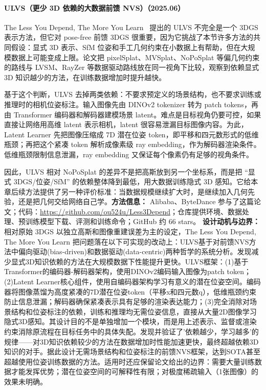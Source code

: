 \paragraph{ULVS（更少 3D 依赖的大数据前馈 NVS）（2025.06）}
The Less You Depend, The More You Learn~\cite{2506_09885} 提出的 ULVS 不完全是一个 3DGS 表示方法，但它对 pose-free 前馈 3DGS 很重要，因为它挑战了本节许多方法的共同假设：显式 3D 表示、SfM 位姿和手工几何约束在小数据上有帮助，但在大规模数据上可能变成上限。论文把 pixelSplat、MVSplat、NoPoSplat 等偏几何约束的路线与 LVSM、RayZer 等数据驱动路线放在同一视角下比较，观察到依赖显式 3D 知识越少的方法，在训练数据增加时提升越快。

基于这个判断，ULVS 去掉两类依赖：不要求预定义的场景结构，也不要求训练或推理时的相机位姿标注。输入图像先由 DINOv2 tokenizer 转为 patch tokens，再由 Transformer 编码器和解码器建模场景 latent。难点是目标视角仍要可控，如果直接让网络用高维 latent 表示相机，latent 很容易泄漏目标图像内容。为此，Latent Learner 先把图像压缩成 7D 潜在位姿 token，即平移和四元数形式的低维瓶颈；再把这个紧凑 token 解析成像素级 ray embedding，作为解码器渲染条件。低维瓶颈限制信息泄漏，ray embedding 又保证每个像素仍有足够的视角条件。

因此，ULVS 相对 NoPoSplat 的差异不是把高斯放到另一个坐标系，而是把 ``显式 3DGS/位姿/SfM'' 的依赖整体降到最低，用大数据训练隐式 3D 感知。它给本章后续方法提供了另一种评价标准：当数据规模继续扩大时，是继续加入几何先验，还是把几何交给网络自己学。\textbf{方法信息：} Alibaba、ByteDance 参与了这篇论文；代码：\url{https://github.com/ou524u/Less3Depend}；仓库提供环境、数据处理、预训练模型下载、评测和训练命令；GitHub 约 66 stars。
\textbf{设计动机与边界：} 相对原始 3DGS 以独立高斯和图像重建误差为主的设定，The Less You Depend, The More You Learn 把问题落在以下可实现的改动上：ULVS基于对前馈NVS方法中偏向驱动(bias-driven)和数据驱动(data-centric)两种哲学的系统分析。发现减少显式3D知识依赖的方法在大规模数据下性能提升更快。ULVS框架：(1)基于Transformer的编码器-解码器架构，使用DINOv2编码输入图像为patch token；(2)Latent Learner核心组件，使用自编码器架构学习有意义的潜在位姿空间。编码器将图像蒸馏为高度紧凑的7D潜在位姿token（平移x和四元数q），低维瓶颈约束防止信息泄漏；解码器确保紧凑表示具有足够的渲染表达能力；(3)完全消除对场景结构和位姿标注的依赖，训练和推理均无需位姿信息，直接从大量2D图像学习隐式3D感知。其设计目的不是单独增加一个模块，而是用上述表示、监督或渲染约束消除原流程在目标任务中的具体失配。发现并验证了'依赖越少，学习越多'的规律——对3D知识依赖较少的方法在数据增加时性能加速更快，最终超越依赖3D知识的对手。据此设计无需场景结构和位姿标注的前馈NVS框架，达到SOTA甚至超越使用位姿训练数据的方法。适用时还应保留论文给出的边界：需要大量训练数据才能发挥优势；潜在位姿空间的可解释性有限；对极度稀疏输入（1张图像）的效果未明确。

